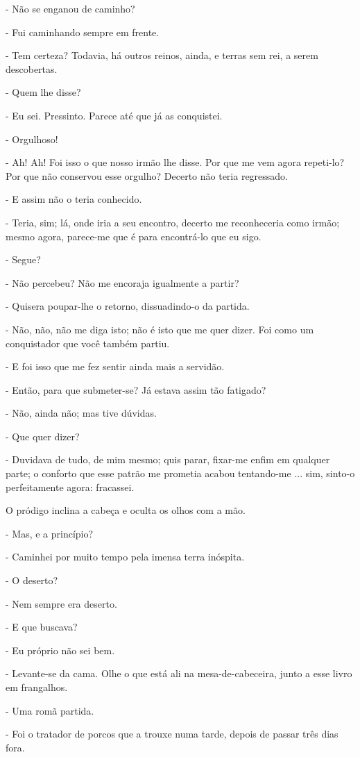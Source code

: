 - Não se enganou de caminho?

- Fui caminhando sempre em frente.

- Tem certeza? Todavia, há outros reinos, ainda, e terras sem rei, a
serem descobertas.

- Quem lhe disse?

- Eu sei. Pressinto. Parece até que já as conquistei.

- Orgulhoso!

- Ah! Ah! Foi isso o que nosso irmão lhe disse. Por que me vem agora
repeti-lo? Por que não conservou esse orgulho? Decerto não teria
regressado.

- E assim não o teria conhecido.

- Teria, sim; lá, onde iria a seu encontro, decerto me reconheceria como
irmão; mesmo agora, parece-me que é para encontrá-lo que eu sigo.

- Segue?

- Não percebeu? Não me encoraja igualmente a partir?

- Quisera poupar-lhe o retorno, dissuadindo-o da partida.

- Não, não, não me diga isto; não é isto que me quer dizer. Foi como um
conquistador que você também partiu.

- E foi isso que me fez sentir ainda mais a servidão.

- Então, para que submeter-se? Já estava assim tão fatigado?

- Não, ainda não; mas tive dúvidas.

- Que quer dizer?

- Duvidava de tudo, de mim mesmo; quis parar, fixar-me enfim em qualquer
parte; o conforto que esse patrão me prometia acabou tentando-me ...
sim, sinto-o perfeitamente agora: fracassei.

O pródigo inclina a cabeça e oculta os olhos com a mão.

- Mas, e a princípio?

- Caminhei por muito tempo pela imensa terra inóspita.

- O deserto?

- Nem sempre era deserto.

- E que buscava?

- Eu próprio não sei bem.

- Levante-se da cama. Olhe o que está ali na mesa-de-cabeceira, junto a
esse livro em frangalhos.

- Uma romã partida.

- Foi o tratador de porcos que a trouxe numa tarde, depois de passar
três dias fora.

